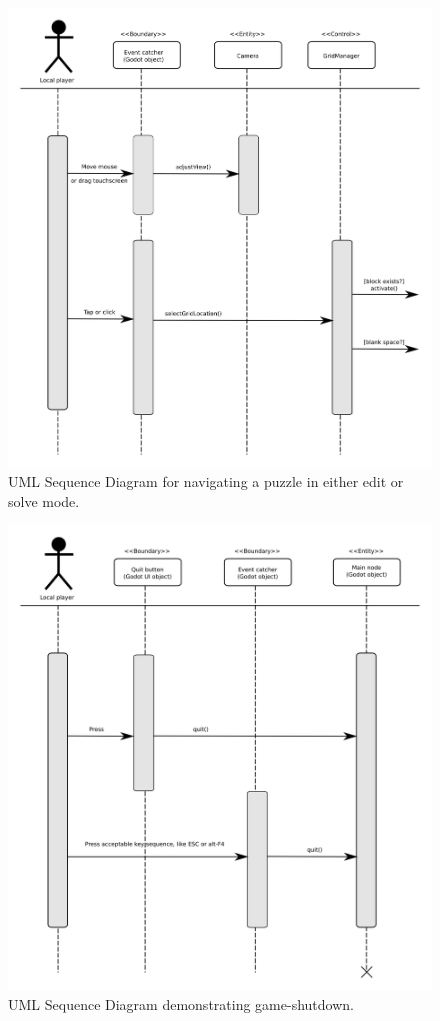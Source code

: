 \documentclass[12pt]{article}
\begin{document}
    \begin{figure}[H]
        \centering
        \includegraphics[width=4.5in]{sequence_navigate_puzzle.png}
        \caption{UML Sequence Diagram for navigating a puzzle in either edit or
        solve mode.}
    \end{figure}


    \begin{figure}[H]
        \centering
        \includegraphics[width=4.5in]{sequence_quit.png}
        \caption{UML Sequence Diagram demonstrating game-shutdown.}
    \end{figure}
\end{document}

